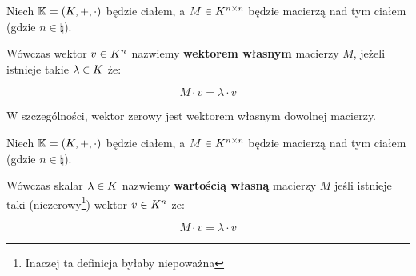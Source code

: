 \begin{definition}
Niech \(\mathbb{K} = (K, +, \cdot)\) będzie ciałem, a \(M \in K^{n \times n}\) będzie macierzą nad tym ciałem (gdzie \(n \in \natural\)). 

Wówczas wektor \(v \in K^n\) nazwiemy \textbf{wektorem własnym} macierzy \(M\), jeżeli istnieje takie \(\lambda \in K\) że:

\[ 
    M \cdot v = \lambda \cdot v
\]

W szczególności, wektor zerowy jest wektorem własnym dowolnej macierzy.
\end{definition}
\begin{definition}
Niech \(\mathbb{K} = (K, +, \cdot)\) będzie ciałem, a \(M \in K^{n \times n}\) będzie macierzą nad tym ciałem (gdzie \(n \in \natural\)).  

Wówczas skalar \( \lambda \in K\) nazwiemy \textbf{wartością własną} macierzy \(M\) jeśli istnieje taki (niezerowy\footnote{Inaczej ta definicja byłaby niepoważna}) wektor \(v \in K^n\) że:

\[
    M \cdot v = \lambda \cdot v
\]
\end{definition}
